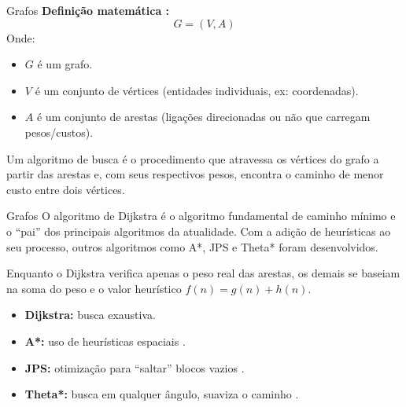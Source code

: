 \documentclass[11pt]{beamer}
\begin{document}
\begin{frame}{Grafos}
    \textbf{Definição matemática \cite{rodacki_grafos}:}
    \begin{equation}
        G = (V, A)
    \end{equation}
    Onde:
    \begin{itemize}
        \item $G$ é um grafo.
        \item $V$ é um conjunto de vértices (entidades individuais, ex: coordenadas).
        \item $A$ é um conjunto de arestas (ligações direcionadas ou não que carregam pesos/custos).
    \end{itemize}
    \vspace{0.8em}
    Um algoritmo de busca é o procedimento que atravessa os vértices do grafo a partir das arestas e, com seus respectivos pesos, encontra o caminho de menor custo entre dois vértices.
\end{frame}

\begin{frame}{Grafos}
    O algoritmo de Dijkstra \cite{rodacki_grafos} é o algoritmo fundamental de caminho mínimo e o ``pai'' dos principais algoritmos da atualidade. Com a adição de heurísticas ao seu processo, outros algoritmos como A*, JPS e Theta* foram desenvolvidos.
    \vspace{1em}
    
    Enquanto o Dijkstra verifica apenas o peso real das arestas, os demais se baseiam na soma do peso e o valor heurístico $f(n) = g(n) + h(n)$.
    \vspace{0.8em}
    \begin{itemize}
        \item \textbf{Dijkstra:} busca exaustiva.
        \item \textbf{A*:} uso de heurísticas espaciais \cite{astar}.
        \item \textbf{JPS:} otimização para ``saltar'' blocos vazios \cite{jps_3d}.
        \item \textbf{Theta*:} busca em qualquer ângulo, suaviza o caminho \cite{nash2013anyangle}.
    \end{itemize}
\end{frame}
\end{document}
